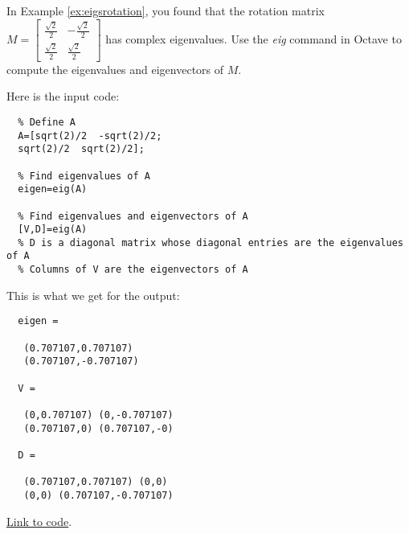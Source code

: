 \documentclass{ximera}
\begin{document}
  \begin{example}\label{ex:complexEig}
  In Example \ref{ex:eigsrotation}, you found that the rotation matrix $M=\begin{bmatrix}
  \frac{\sqrt{2}}{2} & -\frac{\sqrt{2}}{2}\\
  \frac{\sqrt{2}}{2} & \frac{\sqrt{2}}{2}
  \end{bmatrix}$ has complex eigenvalues.  Use the \emph{eig} command in Octave to compute the eigenvalues and eigenvectors of $M$.  
  
  \begin{explanation}
  Here is the input code:
  
  \begin{verbatim}
  % Define A
  A=[sqrt(2)/2  -sqrt(2)/2;
  sqrt(2)/2  sqrt(2)/2];
  
  % Find eigenvalues of A
  eigen=eig(A)
  
  % Find eigenvalues and eigenvectors of A
  [V,D]=eig(A)
  % D is a diagonal matrix whose diagonal entries are the eigenvalues of A
  % Columns of V are the eigenvectors of A
  \end{verbatim}
  
  This is what we get for the output:
  \begin{verbatim}
  eigen =
  
   (0.707107,0.707107)
   (0.707107,-0.707107)
  
  V =
  
   (0,0.707107) (0,-0.707107)
   (0.707107,0) (0.707107,-0)
  
  D =
  
   (0.707107,0.707107) (0,0)
   (0,0) (0.707107,-0.707107)
  \end{verbatim}
  
  \href{https://sagecell.sagemath.org/?z=eJx1jkEKgzAURPeB3GE2AYWWgtviQio9ghtxEepXAzHBGNsev1FoKqXdfOY_ZoYRKKlThlBwVuT1PDmfZOkpA45Rnznb8SibwDkTuCrTglRP5i71QjNst7ZtJA83KdI_Rhl_unnr3sm6OpRNTAqUUMGLVsneGqkxSu_UE4_BzvShZAJdSx3BD_RjkcDF6mU02199GXcLXu8oVg4=&lang=octave&interacts=eJyLjgUAARUAuQ==}{Link to code}.
  

\end{explanation}
\end{example}
\end{document}
